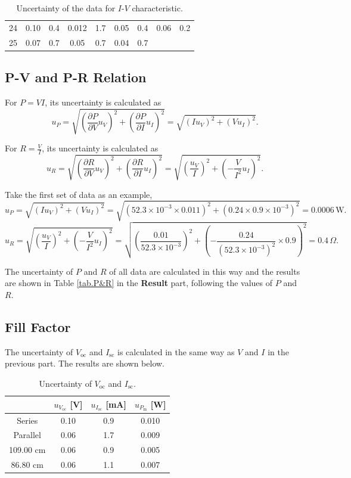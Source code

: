 \documentclass{article}
\begin{document}
{\begin{appendix}
\begin{table}[H]
\begin{tabular}{c|cc||cc||cc||cc}
24 & 0.10             & 0.4              & 0.012             & 1.7               & 0.05               & 0.4               & 0.06              & 0.2               \\
25 & 0.07             & 0.7              & 0.05              & 0.7               & 0.04               & 0.7               &                   &                    \\
        \bottomrule
    \end{tabular}
    \caption{Uncertainty of the data for $I$-$V$ characteristic.}\label{tab.UncIV}
\end{table}

\subsection{P-V and P-R Relation}

For $P = VI$, its uncertainty is calculated as
$$u_P = \sqrt{(\frac{\partial P}{\partial V}u_V)^2 + (\frac{\partial P}{\partial I}u_I)^2} = \sqrt{(Iu_V)^2 + (Vu_I)^2}.$$

For $R = \frac{V}{I}$, its uncertainty is calculated as
$$u_R = \sqrt{(\frac{\partial R}{\partial V}u_V)^2 + (\frac{\partial R}{\partial I}u_I)^2} = \sqrt{(\frac{u_V}{I})^2 + (-\frac{V}{I^2}u_I)^2}.$$

Take the first set of data as an example,
$$u_P = \sqrt{(Iu_V)^2 + (Vu_I)^2} = \sqrt{(52.3\times 10^{-3}\times 0.011)^2 + (0.24\times 0.9\times 10^{-3})^2} = 0.0006\,\text{W}.$$
$$u_R = \sqrt{(\frac{u_V}{I})^2 + (-\frac{V}{I^2}u_I)^2} = \sqrt{(\frac{0.01}{52.3\times 10^{-3}})^2 + (-\frac{0.24}{(52.3\times10^{-3})^2}\times 0.9)^2} = 0.4\,\Omega .$$

The uncertainty of $P$ and $R$ of all data are calculated in this way and the results are shown in Table \ref{tab.P&R} in the \textbf{Result} part, following the values of $P$ and $R$.

\subsection{Fill Factor}
The uncertainty of $V_\text{oc}$ and $I_\text{sc}$ is calculated in the same way as $V$ and $I$ in the previous part. The results are shown below.

\begin{table}[H]\centering
    \begin{tabular}{cccc}
        \toprule
                 & $u_{V_\text{oc}}$ [V] & $u_{I_\text{sc}}$ [mA] & $u_{P_\text{m}}$ [W] \\
        \midrule
        Series & 0.10 & 0.9 & 0.010 \\
        Parallel & 0.06 & 1.7 & 0.009 \\
        109.00 cm & 0.06 & 0.9 & 0.005 \\
        86.80 cm & 0.06 & 1.1 & 0.007 \\
        \bottomrule
    \end{tabular}
    \caption{Uncertainty of $V_\text{oc}$ and $I_\text{sc}$.}
    \label{tab:uncocsc}
\end{table}


\end{appendix}}
\end{document}

